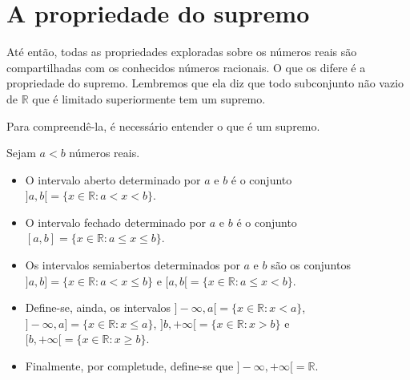 \section{A propriedade do supremo}

Até então, todas as propriedades exploradas sobre os números reais são compartilhadas com os conhecidos números racionais.
O que os difere é a propriedade do supremo.
Lembremos que ela diz que todo subconjunto não vazio de $\mathbb R$ que é limitado superiormente tem um supremo.

Para compreendê-la, é necessário entender o que é um supremo.

\begin{definition}Sejam $a<b$ números reais.
\begin{itemize}
\item O intervalo aberto determinado por $a$ e $b$ é o conjunto $]a,b[=\{x\in\mathbb R: a<x<b\}$.
\item O intervalo fechado determinado por $a$ e $b$ é o conjunto $[a,b]=\{x\in\mathbb R: a\leq x\leq b\}$.
\item Os intervalos semiabertos determinados por $a$ e $b$ são os conjuntos $]a,b]=\{x\in\mathbb R: a<x\leq b\}$ e $[a,b[=\{x\in\mathbb R: a\leq x<b\}$.
\item Define-se, ainda, os intervalos $]-\infty,a[=\{x\in\mathbb R: x<a\}$, $]-\infty,a]=\{x\in\mathbb R: x\leq a\}$, $]b,+\infty[=\{x\in\mathbb R: x>b\}$ e $[b,+\infty[=\{x\in\mathbb R: x\geq b\}$.
\item Finalmente, por completude, define-se que $]-\infty,+\infty[=\mathbb R$.
\end{itemize}
\end{definition}


